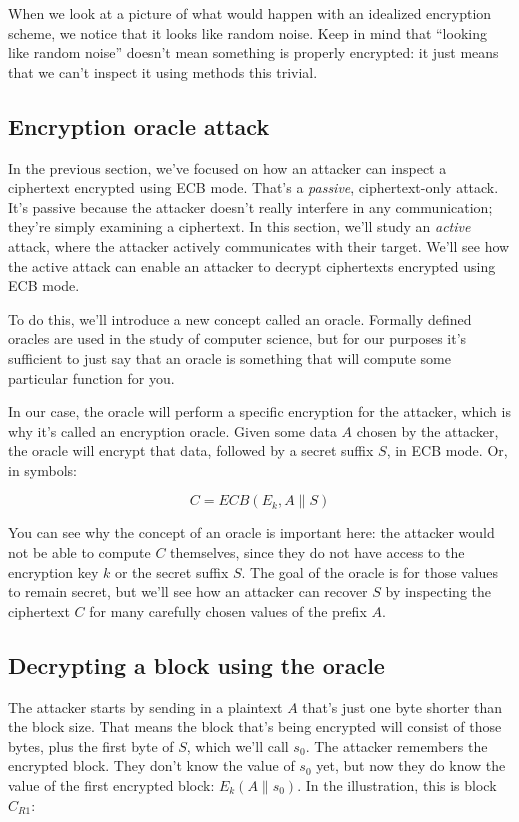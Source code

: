 \documentclass[11pt,ebook,table,dvipsnames]{memoir}
\begin{document}
When we look at a picture of what would happen with an idealized
encryption scheme, we notice that it looks like random noise. Keep in
mind that \enquote{looking like random noise} doesn't mean something is
properly encrypted: it just means that we can't inspect it using
methods this trivial.
\subsection{Encryption oracle attack}
\label{sec-2-3-2-2}

In the previous section, we've focused on how an attacker can inspect
a ciphertext encrypted using \gls{ECB mode}. That's a \emph{passive},
ciphertext-only attack. It's passive because the attacker doesn't
really interfere in any communication; they're simply examining a
ciphertext. In this section, we'll study an \emph{active} attack, where the
attacker actively communicates with their target. We'll see how the
active attack can enable an attacker to decrypt ciphertexts encrypted
using ECB mode.

To do this, we'll introduce a new concept called an \gls{oracle}.
Formally defined oracles are used in the study of computer science,
but for our purposes it's sufficient to just say that an oracle is
something that will compute some particular function for you.

In our case, the oracle will perform a specific encryption for the
attacker, which is why it's called an \gls{encryption oracle}. Given
some data $A$ chosen by the attacker, the oracle will encrypt that
data, followed by a secret suffix $S$, in ECB mode. Or, in symbols:

\[
C = ECB(E_k, A \| S)
\]

You can see why the concept of an oracle is important here: the
attacker would not be able to compute $C$ themselves, since they do
not have access to the encryption key $k$ or the secret suffix $S$.
The goal of the oracle is for those values to remain secret, but we'll
see how an attacker can recover $S$ by inspecting the ciphertext $C$
for many carefully chosen values of the prefix $A$.
\subsection{Decrypting a block using the oracle}
\label{sec-2-3-2-3}

The attacker starts by sending in a plaintext $A$ that's just one byte
shorter than the block size. That means the block that's being
encrypted will consist of those bytes, plus the first byte of $S$,
which we'll call $s_0$. The attacker remembers the encrypted block.
They don't know the value of $s_0$ yet, but now they do know the value
of the first encrypted block: $E_k(A \| s_0)$. In the illustration,
this is block $C_{R1}$:
\end{document}
